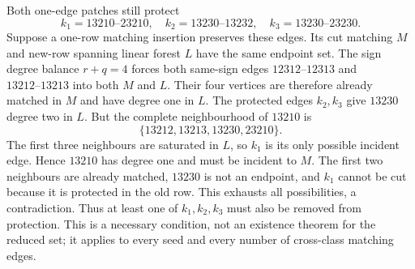 Both one-edge patches still protect
\[
k_1=13210\text{--}23210,\quad
k_2=13230\text{--}13232,\quad
k_3=13230\text{--}23230.
\]
Suppose a one-row matching insertion preserves these edges.
Its cut matching $M$ and new-row spanning linear forest $L$ have
the same endpoint set. The sign degree balance $r+q=4$ forces
both same-sign edges $12312\text{--}12313$ and
$13212\text{--}13213$ into both $M$ and $L$. Their four vertices
are therefore already matched in $M$ and have degree one in $L$.
The protected edges $k_2,k_3$ give $13230$ degree two in $L$.
But the complete neighbourhood of $13210$ is
\[
\{13212,13213,13230,23210\}.
\]
The first three neighbours are saturated in $L$, so $k_1$ is its
only possible incident edge. Hence $13210$ has degree one and must
be incident to $M$. The first two neighbours are already matched,
$13230$ is not an endpoint, and $k_1$ cannot be cut because it is
protected in the old row. This exhausts all possibilities, a
contradiction. Thus at least one of $k_1,k_2,k_3$ must also be
removed from protection. This is a necessary condition, not an
existence theorem for the reduced set; it applies to every seed
and every number of cross-class matching edges.
